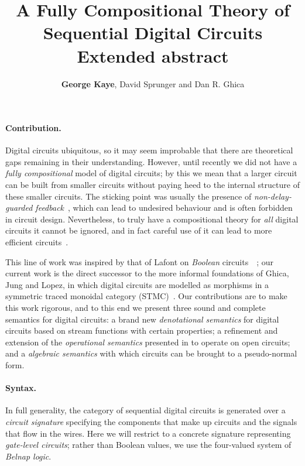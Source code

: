 \documentclass[10pt]{article}
\title{
    \vspace{-3em}
    A Fully Compositional Theory of Sequential Digital Circuits
    \\
    \textbf{Extended abstract}
}
\author{\textbf{George Kaye}, David Sprunger and Dan R. Ghica}
\date{}
\begin{document}
\maketitle

\paragraph*{Contribution.}

Digital circuits ubiquitous, so it may seem improbable that there are
theoretical gaps remaining in their understanding.
However, until recently we did not have a \emph{fully compositional} model of
digital circuits; by this we mean that a larger circuit can be built from
smaller circuits without paying heed to the internal
structure of these smaller circuits.
The sticking point was usually the presence of
\emph{non-delay-guarded feedback}~\cite{malik1994analysis}, which can lead to
undesired behaviour and is often forbidden in circuit design.
Nevertheless, to truly have a compositional theory for \emph{all} digital
circuits it cannot be ignored, and in fact careful use of it can lead to more
efficient circuits~\cite{riedel2004cyclic,riedel2012cyclic}.

This line of work was inspired by that of Lafont on
\emph{Boolean} circuits~~\cite{lafont2003algebraic}; our current work is the
direct successor to the more informal foundations of Ghica, Jung and Lopez, in
which digital circuits are modelled as morphisms in a symmetric traced
monoidal category (STMC)~\cite{ghica2016categorical,ghica2017diagrammatic}.
Our contributions are to make this work rigorous, and to this end we present
three sound and complete semantics for digital circuits: a brand new
\emph{denotational semantics} for digital circuits based on stream functions
with certain properties; a refinement and extension of the
\emph{operational semantics} presented in \cite{ghica2017diagrammatic} to
operate on open circuits; and a \emph{algebraic semantics} with which circuits
can be brought to a pseudo-normal form.

\paragraph*{Syntax.}

In full generality, the category of sequential digital circuits is generated
over a \emph{circuit signature} specifying the components that make up circuits
and the signals that flow in the wires.
Here we will restrict to a concrete signature
representing \emph{gate-level circuits}; rather than Boolean values, we use the
four-valued system of \emph{Belnap logic}.
\end{document}
